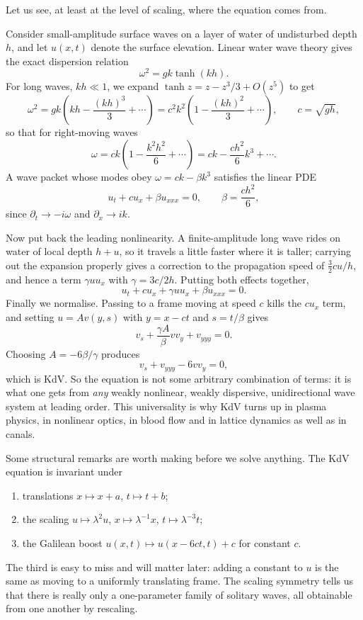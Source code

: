 \documentclass[a4paper]{scrartcl}
\begin{document}
Let us see, at least at the level of scaling, where the equation comes from.

\begin{example}
	Consider small-amplitude surface waves on a layer of water of undisturbed depth $h$, and let $u(x,t)$ denote the surface elevation. Linear water wave theory gives the exact dispersion relation
	$$
	\omega^2 = gk\tanh(kh).
	$$
	For long waves, $kh \ll 1$, we expand $\tanh z = z - z^3/3 + O(z^5)$ to get
	$$
	\omega^2 = gk\left(kh - \frac{(kh)^3}{3} + \cdots\right) = c^2k^2\left(1 - \frac{(kh)^2}{3}+\cdots\right), \qquad c = \sqrt{gh},
	$$
	so that for right-moving waves
	$$
	\omega = ck\left(1 - \frac{k^2h^2}{6} + \cdots\right) = ck - \frac{ch^2}{6}k^3 + \cdots.
	$$
	A wave packet whose modes obey $\omega = ck - \beta k^3$ satisfies the linear PDE
	$$
	u_t + cu_x + \beta u_{xxx} = 0, \qquad \beta = \frac{ch^2}{6},
	$$
	since $\partial_t \to -i\omega$ and $\partial_x\to ik$.

	Now put back the leading nonlinearity. A finite-amplitude long wave rides on water of local depth $h + u$, so it travels a little faster where it is taller; carrying out the expansion properly gives a correction to the propagation speed of $\tfrac{3}{2}cu/h$, and hence a term $\gamma u u_x$ with $\gamma = 3c/2h$. Putting both effects together,
	$$
	u_t + cu_x + \gamma uu_x + \beta u_{xxx} = 0.
	$$
	Finally we normalise. Passing to a frame moving at speed $c$ kills the $cu_x$ term, and setting $u = Av(y, s)$ with $y = x - ct$ and $s = t/\beta$ gives
	$$
	v_s + \frac{\gamma A}{\beta}vv_y + v_{yyy} = 0.
	$$
	Choosing $A = -6\beta/\gamma$ produces
	$$
	v_s + v_{yyy} - 6vv_y = 0,
	$$
	which is KdV. So the equation is not some arbitrary combination of terms: it is what one gets from \emph{any} weakly nonlinear, weakly dispersive, unidirectional wave system at leading order. This universality is why KdV turns up in plasma physics, in nonlinear optics, in blood flow and in lattice dynamics as well as in canals.
\end{example}

Some structural remarks are worth making before we solve anything. The KdV equation is invariant under
\begin{enumerate}[label=(\roman*)]
	\item translations $x\mapsto x + a$, $t\mapsto t+b$;
	\item the scaling $u \mapsto \lambda^2 u$, $x\mapsto \lambda^{-1}x$, $t\mapsto \lambda^{-3}t$;
	\item the Galilean boost $u(x,t)\mapsto u(x - 6ct, t) + c$ for constant $c$.
\end{enumerate}
The third is easy to miss and will matter later: adding a constant to $u$ is the same as moving to a uniformly translating frame. The scaling symmetry tells us that there is really only a one-parameter family of solitary waves, all obtainable from one another by rescaling.
\end{document}
